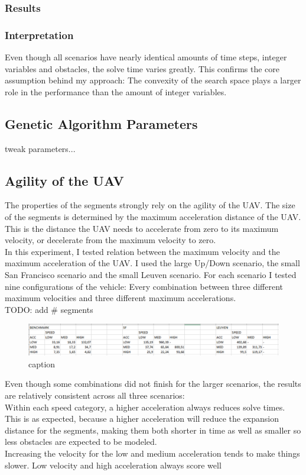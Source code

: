\subsubsection{Results}

\subsubsection{Interpretation}
Even though all scenarios have nearly identical amounts of time steps, integer variables and obstacles, the solve time varies greatly. This confirms the core assumption behind my approach: The convexity of the search space plays a larger role in the performance than the amount of integer variables.




\clearpage
\subsection{Genetic Algorithm Parameters}
tweak parameters...



\clearpage
\subsection{Agility of the UAV}
The properties of the segments strongly rely on the agility of the UAV. The size of the segments is determined by the maximum acceleration distance of the UAV. This is the distance the UAV needs to accelerate from zero to its maximum velocity, or decelerate from the maximum velocity to zero. \\
In this experiment, I tested relation between the maximum velocity and the maximum acceleration of the UAV. I used the large Up/Down scenario, the small San Francisco scenario and the small Leuven scenario. For each scenario I tested nine configurations of the vehicle: Every combination between three different maximum velocities and three different maximum accelerations.\\
TODO: add \# segments

\begin{figure}
\includegraphics[width=\textwidth]{img/agility1}
caption{}
\label{fig:agility-times}
\end{figure}
Even though some combinations did not finish for the larger scenarios, the results are relatively consistent across all three scenarios:\\
Within each speed category, a higher acceleration always reduces solve times. This is as expected, because a higher acceleration will reduce the expansion distance for the segments, making them both shorter in time as well as smaller so less obstacles are expected to be modeled.\\
Increasing the velocity for the low and medium acceleration tends to make things slower.
Low velocity and high acceleration always score well






